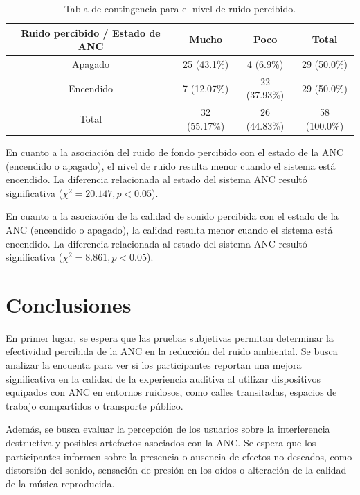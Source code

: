 \documentclass[a4paper,12pt]{article}
\begin{document}
\begin{table}[ht]
    \centering
    \begin{tabular}{|c|c|c|c|}
        \hline
        \textbf{Ruido percibido / Estado de ANC} & \textbf{Mucho} & \textbf{Poco} & \textbf{Total} \\
        \hline
        Apagado & 25 (43.1\%) & 4 (6.9\%) & 29 (50.0\%) \\
        \hline
        Encendido & 7 (12.07\%) & 22 (37.93\%) & 29 (50.0\%) \\
        \hline
        Total & 32 (55.17\%) & 26 (44.83\%) & 58 (100.0\%) \\
        \hline
\end{tabular}
\caption{Tabla de contingencia para el nivel de ruido percibido.}
\label{tab:cross_Y1}
\end{table}

En cuanto a la asociación del ruido de fondo percibido con el estado de la ANC (encendido o apagado), el nivel de ruido resulta menor cuando el sistema está encendido.
La diferencia relacionada al estado del sistema ANC resultó significativa ($\chi^2 = 20.147, p < 0.05$).

En cuanto a la asociación de la calidad de sonido percibida con el estado de la ANC (encendido o apagado), la calidad resulta menor cuando el sistema está encendido.
La diferencia relacionada al estado del sistema ANC resultó significativa ($\chi^2 = 8.861, p < 0.05$).

\section{Conclusiones}
\label{sec:conclusions}

En primer lugar, se espera que las pruebas subjetivas permitan determinar la efectividad percibida de la ANC en la reducción del ruido ambiental.
Se busca analizar la encuenta para ver si los participantes reportan una mejora significativa en la calidad de la experiencia auditiva al utilizar dispositivos equipados con ANC en entornos ruidosos, como calles transitadas, espacios de trabajo compartidos o transporte público.

Además, se busca evaluar la percepción de los usuarios sobre la interferencia destructiva y posibles artefactos asociados con la ANC.
Se espera que los participantes informen sobre la presencia o ausencia de efectos no deseados, como distorsión del sonido, sensación de presión en los oídos o alteración de la calidad de la música reproducida.
\end{document}
